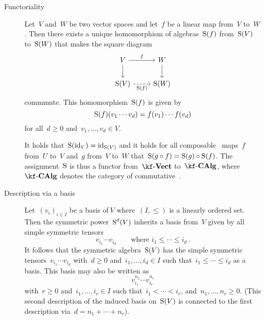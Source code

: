 \begin{recall}
\begin{description}
		\item[Functoriality]
			Let~$V$ and~$W$ be two vector spaces and let~$f$ be a linear map from~$V$ to~$W$.
			Then there exists a unique homomorphism of algebras~$\operatorname{S}(f)$ from~$\operatorname{S}(V)$ to~$\operatorname{S}(W)$ that makes the square diagram
			\[
				\begin{tikzcd}
					V
					\arrow{r}[above]{f}
					\arrow{d}
					&
					W
					\arrow{d}
					\\
					\Symm(V)
					\arrow[dashed]{r}[below]{\Symm(f)}
					&
					\Symm(W)
				\end{tikzcd}
			\]
			commmute.
			This homomorphism~$\operatorname{S}(f)$ is given by
			\[
				\operatorname{S}(f)(v_1 \dotsm v_d)
				=
				f(v_1) \dotsm f(v_d)
			\]
			for all~$d \geq 0$ and~$v_1, \dotsc, v_d \in V$.

			It holds that~$\operatorname{S}(\mathrm{id}_V) = \mathrm{id}_{\operatorname{S}(V)}$ and it holds for all composable~{\linear{$\kf$}} maps~$f$ from~$U$ to~$V$ and~$g$ from~$V$ to~$W$ that~$\operatorname{S}(g \circ f) = \operatorname{S}(g) \circ \operatorname{S}(f)$.
			The assignment~$\operatorname{S}$ is thus a functor from~$\cVect{\kf}$ to~$\cCAlg{\kf}$, where~$\cCAlg{\kf}$ denotes the category of commutative~{\algebras{$\kf$}}.
			
		\item[Description via a basis]
			Let~$(v_i)_{i \in I}$ be a basis of$~V$ where~$(I, \leq)$ is a linearly ordered set.
			Then the symmetric power~$\operatorname{S}^d(V)$ inherits a basis from~$V$ given by all simple symmetric tensors
			\[
				v_{i_1} \dotsm v_{i_d}
				\qquad
				\text{where~$i_1 \leq \dotsb \leq i_d$} \,.
			\]
			It follows that the symmetric algebra~$\operatorname{S}(V)$ has the simple symmetric tensors~$v_{i_1} \dotsm v_{i_d}$ with~$d \geq 0$ and~$i_1, \dotsc, i_d \in I$ such that~$i_1 \leq \dotsb \leq i_d$ as a basis.
			This basis may also be written as
			\[
				v_{i_1}^{n_1} \dotsm v_{i_r}^{n_r}
			\]
			with~$r \geq 0$ and~$i_1, \dotsc, i_r \in I$ such that~$i_1 < \dotsb < i_r$, and~$n_1, \dotsc, n_r \geq 0$.
			(This second description of the induced basis on~$\operatorname{S}(V)$ is connected to the first description via~$d = n_1 + \dotsb + n_r$).
			

\end{description}
\end{recall}

